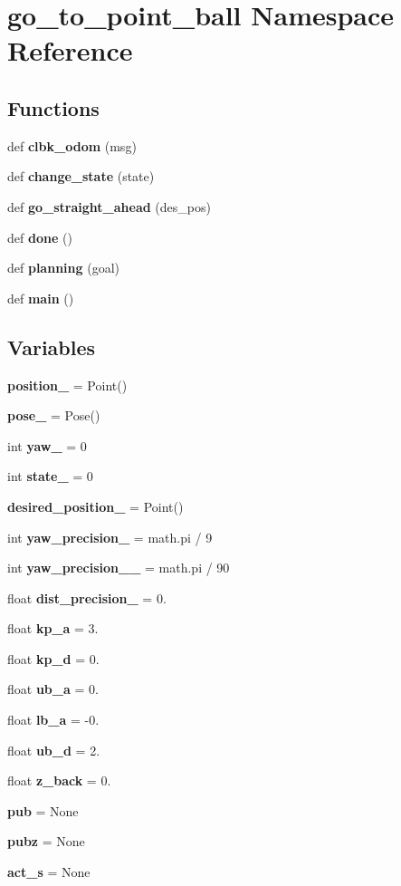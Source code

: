 \section{go\+\_\+to\+\_\+point\+\_\+ball Namespace Reference}
\label{namespacego__to__point__ball}
\subsection*{Functions}
\begin{DoxyCompactItemize}
\item 
def \textbf{ clbk\+\_\+odom} (msg)
\item 
def \textbf{ change\+\_\+state} (state)
\item 
def \textbf{ go\+\_\+straight\+\_\+ahead} (des\+\_\+pos)
\item 
def \textbf{ done} ()
\item 
def \textbf{ planning} (goal)
\item 
def \textbf{ main} ()
\end{DoxyCompactItemize}
\subsection*{Variables}
\begin{DoxyCompactItemize}
\item 
\textbf{ position\+\_\+} = Point()
\item 
\textbf{ pose\+\_\+} = Pose()
\item 
int \textbf{ yaw\+\_\+} = 0
\item 
int \textbf{ state\+\_\+} = 0
\item 
\textbf{ desired\+\_\+position\+\_\+} = Point()
\item 
int \textbf{ yaw\+\_\+precision\+\_\+} = math.\+pi / 9
\item 
int \textbf{ yaw\+\_\+precision\+\_\+\_\+} = math.\+pi / 90
\item 
float \textbf{ dist\+\_\+precision\+\_\+} = 0.
\item 
float \textbf{ kp\+\_\+a} = 3.
\item 
float \textbf{ kp\+\_\+d} = 0.
\item 
float \textbf{ ub\+\_\+a} = 0.
\item 
float \textbf{ lb\+\_\+a} = -\/0.
\item 
float \textbf{ ub\+\_\+d} = 2.
\item 
float \textbf{ z\+\_\+back} = 0.
\item 
\textbf{ pub} = None
\item 
\textbf{ pubz} = None
\item 
\textbf{ act\+\_\+s} = None
\end{DoxyCompactItemize}


